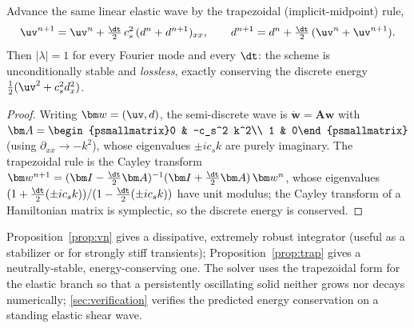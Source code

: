 \begin{proposition}
\label{prop:trap}
Advance the same linear elastic wave by the trapezoidal (implicit-midpoint) rule,
\begin{equation*}
\uv^{n+1}=\uv^{n}+\tfrac{\dt}{2}\,c_s^2\,(d^n+d^{n+1})_{xx},\qquad
d^{n+1}=d^{n}+\tfrac{\dt}{2}\,(\uv^{n}+\uv^{n+1}).
\end{equation*}
Then $|\lambda|=1$ for every Fourier mode and every $\dt$: the scheme is unconditionally
stable and \emph{lossless}, exactly conserving the discrete energy
$\tfrac12(\uv^2+c_s^2 d_x^2)$.
\end{proposition}
\begin{proof}
Writing $\bm w=(\uv,d)$, the semi-discrete wave is $\dot{\bm w}=\bm A\bm w$ with
$\bm A=\begin{psmallmatrix}0 & -c_s^2 k^2\\ 1 & 0\end{psmallmatrix}$ (using
$\partial_{xx}\to-k^2$), whose eigenvalues $\pm i c_s k$ are purely imaginary. The
trapezoidal rule is the Cayley transform
$\bm w^{n+1}=(\bm I-\tfrac{\dt}{2}\bm A)^{-1}(\bm I+\tfrac{\dt}{2}\bm A)\,\bm w^{n}$,
whose eigenvalues $(1+\tfrac{\dt}{2}(\pm i c_s k))/(1-\tfrac{\dt}{2}(\pm i c_s k))$ have
unit modulus; the Cayley transform of a Hamiltonian matrix is symplectic, so the discrete
energy is conserved. \hfill
\end{proof}

\begin{remark}
Proposition~\ref{prop:vn} gives a dissipative, extremely robust integrator (useful as a
stabilizer or for strongly stiff transients); Proposition~\ref{prop:trap} gives a
neutrally-stable, energy-conserving one. The solver uses the trapezoidal form for the
elastic branch so that a persistently oscillating solid neither grows nor decays
numerically; \cref{sec:verification} verifies the predicted energy conservation on a
standing elastic shear wave.
\end{remark}

